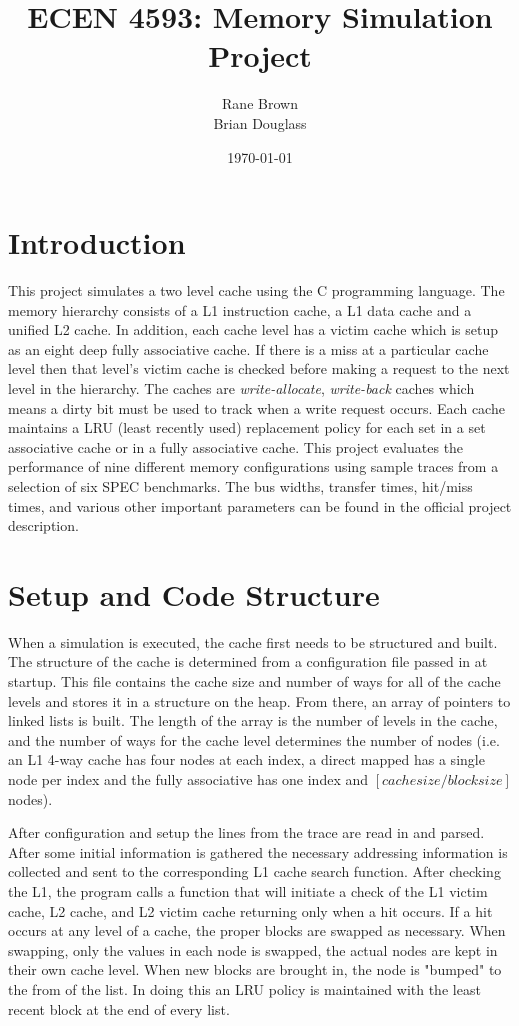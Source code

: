 \documentclass[11pt,titlepage]{article}
\author{Rane Brown \\ Brian Douglass}
\title{ECEN 4593: Memory Simulation Project}
\date{\today}
\begin{document}
\maketitle
\tableofcontents
\listoffigures \listoftables
\newpage

\section{Introduction}
This project simulates a two level cache using the C programming language. The memory hierarchy consists of a L1 instruction cache, a L1 data cache and a unified L2 cache. In addition, each cache level has a victim cache which is setup as an eight deep fully associative cache. If there is a miss at a particular cache level then that level's victim cache is checked before making a request to the next level in the hierarchy. The caches are \emph{write-allocate}, \emph{write-back} caches which means a dirty bit must be used to track when a write request occurs. Each cache maintains a LRU (least recently used) replacement policy for each set in a set associative cache or in a fully associative cache. This project evaluates the performance of nine different memory configurations using sample traces from a selection of six SPEC benchmarks. The bus widths, transfer times, hit/miss times, and various other important parameters can be found in the official project description.

\section{Setup and Code Structure}
When a simulation is executed, the cache first needs to be structured and built. The structure of the cache is determined from a configuration file passed in at startup. This file contains the cache size and number of ways for all of the cache levels and stores it in a structure on the heap. From there, an array of pointers to linked lists is built. The length of the array is the number of levels in the cache, and the number of ways for the cache level determines the number of nodes (i.e. an L1 4-way cache has four nodes at each index, a direct mapped has a single node per index and the fully associative has one index and $[cache size / block size]$ nodes).

After configuration and setup the lines from the trace are read in and parsed. After some initial information is gathered the necessary addressing information is collected and sent to the corresponding L1 cache search function. After checking the L1, the program calls a function that will initiate a check of the L1 victim cache, L2 cache, and L2 victim cache returning only when a hit occurs. If a hit occurs at any level of a cache, the proper blocks are swapped as necessary. When swapping, only the values in each node is swapped, the actual nodes are kept in their own cache level. When new blocks are brought in, the node is "bumped" to the from of the list. In doing this an LRU policy is maintained with the least recent block at the end of every list.
\end{document}
